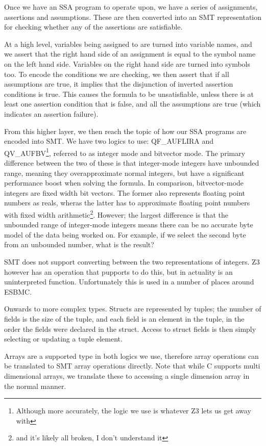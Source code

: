 \documentclass{article}
\begin{document}
Once we have an SSA program to operate upon, we have a series of assignments,
assertions and assumptions. These are then converted into an SMT representation
for checking whether any of the assertions are satisfiable.

At a high level, variables being assigned to are turned into variable names,
and we assert that the right hand side of an assignment is equal to the symbol
name on the left hand side. Variables on the right hand side are turned into
symbols too. To encode the conditions we are checking, we then assert that if
all assumptions are true, it implies that the disjunction of inverted assertion
conditions is true. This causes the formula to be unsatisfiable, unless there
is at least one assertion condition that is false, and all the assumptions are
true (which indicates an assertion failure).

From this higher layer, we then reach the topic of how our SSA programs are
encoded into SMT. We have two logics to use: QF\_AUFLIRA and
QV\_AUFBV\footnote{Although more accurately, the logic we use is whatever Z3
lets us get away with}, referred to as integer mode and bitvector mode.
The primary difference between the two of these is that
integer-mode integers have unbounded range, meaning they overapproximate normal
integers, but have a significant performance boost when solving the formula.
In comparison, bitvector-mode integers are fixed width bit vectors.
The former also represents floating point numbers as reals, wheras the latter
has to approximate floating point numbers with fixed width
arithmetic\footnote{and it's likely all broken, I don't understand it}. However;
the largest difference is that the unbounded range of integer-mode integers
means there can be no accurate byte model of the data being worked on. For
example, if we select the second byte from an unbounded number, what is the
result?

SMT does not support converting between the two representations of integers.
Z3 however has an operation that pupports to do this, but in actuality is an
uninterpreted function. Unfortunately this is used in a number of places
around ESBMC.

Onwards to more complex types. Structs are represented by tuples; the number
of fields is the size of the tuple, and each field is an element in the tuple,
in the order the fields were declared in the struct. Access to struct fields
is then simply selecting or updating a tuple element.

Arrays are a supported type in both logics we use, therefore array operations
can be translated to SMT array operations directly. Note that while C supports
multi dimensional arrays, we translate these to accessing a single dimension
array in the normal manner.
\end{document}
